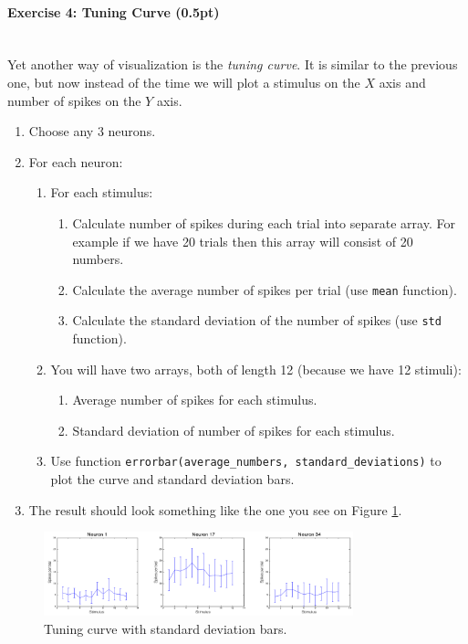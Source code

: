 \documentclass[a4paper,11pt]{article}
\newenvironment{exercise}[3]{\paragraph{Exercise #1: #2 (#3pt)}\ \\}{
\medskip}
\begin{document}
\begin{exercise}{4}{Tuning Curve}{0.5}
Yet another way of visualization is the \emph{tuning curve}. It is similar to the previous one, but now instead of the time we will plot a stimulus on the $X$ axis and number of spikes on the $Y$ axis.
\begin{enumerate}
	\item Choose any 3 neurons.
	\item For each neuron:
	\begin{enumerate}
		\item For each stimulus:
		\begin{enumerate}
			\item Calculate number of spikes during each trial into separate array. For example if we have 20 trials then this array will consist of 20 numbers.
			\item Calculate the average number of spikes per trial (use \texttt{mean} function).
			\item Calculate the standard deviation of the number of spikes (use \texttt{std} function).
		\end{enumerate}	
		\item You will have two arrays, both of length 12 (because we have 12 stimuli):
		\begin{enumerate}
			\item Average number of spikes for each stimulus.
			\item Standard deviation of number of spikes for each stimulus.
		\end{enumerate}
		\item Use function \texttt{errorbar(average\_numbers, standard\_deviations)} to plot the curve and standard deviation bars.
	\end{enumerate}
	\item The result should look something like the one you see on Figure \ref{fig:tuningcurve}.
\end{enumerate}

\begin{figure}[H]
   \centering
   \includegraphics[width=0.8\textwidth]{tuningcurve.png} 
   \caption{Tuning curve with standard deviation bars.}
   \label{fig:tuningcurve}
\end{figure}

\end{exercise}
\end{document}
